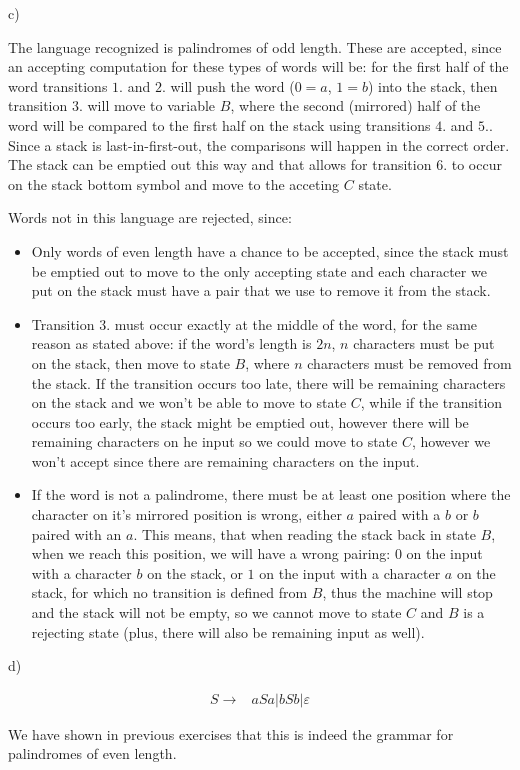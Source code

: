 c)

The language recognized is palindromes of odd length. These are accepted, since an accepting computation for these types of words will be: for the first half of the word transitions $1.$ and $2.$ will push the word ($0=a$, $1=b$) into the stack, then transition $3.$ will move to variable $B$, where the second (mirrored) half of the word will be compared to the first half on the stack using transitions $4.$ and $5.$. Since a stack is last-in-first-out, the comparisons will happen in the correct order. The stack can be emptied out this way and that allows for transition $6.$ to occur on the stack bottom symbol and move to the acceting $C$ state.

Words not in this language are rejected, since:
\begin{itemize}
    \item Only words of even length have a chance to be accepted, since the stack must be emptied out to move to the only accepting state and each character we put on the stack must have a pair that we use to remove it from the stack.
    \item Transition $3.$ must occur exactly at the middle of the word, for the same reason as stated above: if the word's length is $2n$, $n$ characters must be put on the stack, then move to state $B$, where $n$ characters must be removed from the stack. If the transition occurs too late, there will be remaining characters on the stack and we won't be able to move to state $C$, while if the transition occurs too early, the stack might be emptied out, however there will be remaining characters on he input so we could move to state $C$, however we won't accept since there are remaining characters on the input.
    \item If the word is not a palindrome, there must be at least one position where the character on it's mirrored position is wrong, either $a$ paired with a $b$ or $b$ paired with an $a$. This means, that when reading the stack back in state $B$, when we reach this position, we will have a wrong pairing: $0$ on the input with a character $b$ on the stack, or $1$ on the input with a character $a$ on the stack, for which no transition is defined from $B$, thus the machine will stop and the stack will not be empty, so we cannot move to state $C$ and $B$ is a rejecting state (plus, there will also be remaining input as well).
\end{itemize}

d)

\begin{align*}
    S \rightarrow& aSa | bSb | \varepsilon
\end{align*}

We have shown in previous exercises that this is indeed the grammar for palindromes of even length.
